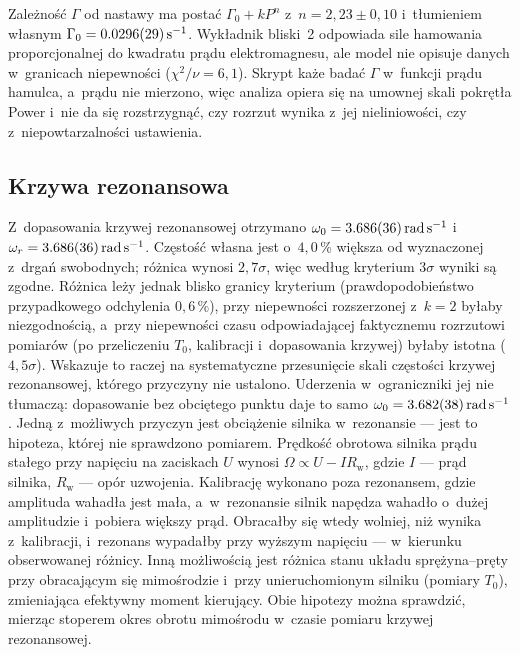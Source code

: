 \documentclass[12pt, a4paper]{article}
\begin{document}
Zależność $\Gamma$ od nastawy ma postać $\Gamma_0 + kP^n$ z~$n = 2{,}23 \pm 0{,}10$
i~tłumieniem własnym $\Gamma_0 = \SI{0.0296 \pm 0.0029}{\per\second}$. Wykładnik bliski~2
odpowiada sile hamowania proporcjonalnej do kwadratu prądu elektromagnesu, ale model
nie opisuje danych w~granicach niepewności ($\chi^2/\nu = 6{,}1$). Skrypt każe badać
$\Gamma$ w~funkcji prądu hamulca, a~prądu nie mierzono, więc analiza opiera się na
umownej skali pokrętła Power i~nie da się rozstrzygnąć, czy rozrzut wynika z~jej
nieliniowości, czy z~niepowtarzalności ustawienia.

\subsection{Krzywa rezonansowa}

Z~dopasowania krzywej rezonansowej otrzymano
$\omega_0 = \SI{3.686 \pm 0.036}{\radian\per\second}$ i~$\omega_r = \SI{3.686 \pm 0.036}{\radian\per\second}$.
Częstość własna jest o~$4{,}0\,\%$ większa od wyznaczonej z~drgań swobodnych; różnica
wynosi $2{,}7\sigma$, więc według kryterium $3\sigma$ wyniki są zgodne. Różnica leży jednak
blisko granicy kryterium (prawdopodobieństwo przypadkowego odchylenia $0{,}6\,\%$),
przy niepewności rozszerzonej z~$k = 2$ byłaby niezgodnością, a~przy niepewności czasu
odpowiadającej faktycznemu rozrzutowi pomiarów (po przeliczeniu $T_0$, kalibracji
i~dopasowania krzywej) byłaby istotna ($4{,}5\sigma$). Wskazuje to raczej na
systematyczne przesunięcie skali częstości krzywej rezonansowej, którego przyczyny
nie ustalono. Uderzenia w~ograniczniki jej nie tłumaczą: dopasowanie bez obciętego
punktu daje to samo $\omega_0 = \SI{3.682 \pm 0.038}{\radian\per\second}$.
Jedną z~możliwych przyczyn jest obciążenie silnika w~rezonansie ---
jest to hipoteza, której nie sprawdzono pomiarem. Prędkość obrotowa silnika prądu
stałego przy napięciu na zaciskach $U$ wynosi $\Omega \propto U - I R_\text{w}$, gdzie
$I$ --- prąd silnika, $R_\text{w}$ --- opór uzwojenia. Kalibrację wykonano poza
rezonansem, gdzie amplituda wahadła jest mała, a~w~rezonansie silnik napędza wahadło
o~dużej amplitudzie i~pobiera większy prąd. Obracałby się wtedy wolniej, niż wynika
z~kalibracji, i~rezonans wypadałby przy wyższym napięciu --- w~kierunku obserwowanej
różnicy. Inną możliwością jest różnica stanu układu sprężyna--pręty przy obracającym
się mimośrodzie i~przy unieruchomionym silniku (pomiary $T_0$), zmieniająca efektywny
moment kierujący. Obie hipotezy można sprawdzić, mierząc stoperem okres obrotu mimośrodu
w~czasie pomiaru krzywej rezonansowej.
\end{document}

